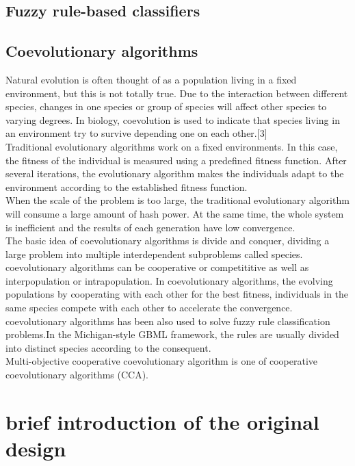\documentclass[conference,compsoc]{IEEEtran}
\begin{document}
\subsection{Fuzzy rule-based classifiers}

\subsection{Coevolutionary algorithms}
Natural evolution is often thought of as a population living in a fixed environment, but this is not totally true. Due to the interaction between different species, changes in one species or group of species will affect other species to varying degrees. In biology, coevolution is used to indicate that species living in an environment try to survive depending one on each other.[3]\\
\indent Traditional evolutionary algorithms work on a fixed environments. In this case, the fitness of the individual is measured using a predefined fitness function. After several iterations, the evolutionary algorithm makes the individuals adapt to the environment according to the established fitness function.\\
\indent When the scale of the problem is too large, the traditional evolutionary algorithm will consume a large amount of hash power. At the same time, the whole system is inefficient and the results of each generation have low convergence.\\
\indent The basic idea of coevolutionary algorithms is divide and conquer, dividing a large problem into multiple interdependent subproblems called species. coevolutionary algorithms can be cooperative or competititive as well as interpopulation or intrapopulation. In coevolutionary algorithms, the evolving populations by cooperating with each other for the best fitness, individuals in the same species compete with each other to accelerate the convergence. \\
\indent coevolutionary algorithms has been also used to solve fuzzy rule classification problems.In the Michigan-style GBML framework, the rules are usually divided into distinct species according to the consequent. \\
\indent Multi-objective cooperative coevolutionary algorithm is one of cooperative coevolutionary algorithms (CCA).

\section{brief introduction of the original design}
\end{document}

